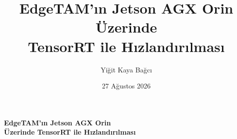 \documentclass{scrreprt}
\title{EdgeTAM'ın Jetson AGX Orin Üzerinde\\TensorRT ile Hızlandırılması}
\author{Yiğit Kaya Bağcı}
\date{27 Ağustos 2026}
\begin{document}
\begin{titlepage}
  \centering
  \vspace*{2cm}
  {\sffamily\bfseries\Huge\color{anarenk} EdgeTAM'ın Jetson AGX Orin\\[2mm]
   Üzerinde TensorRT ile Hızlandırılması\par}
  \vspace{2cm}
  {\large \theauthor \par}
  \vspace{0.3cm}
  {\large \thedate \par}
  \vfill
\end{titlepage}



\begingroup
\footnotesize
\tableofcontents
\endgroup

\setcounter{page}{1}









\printbibliography[title={Kaynakça}]
\end{document}
